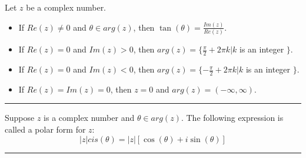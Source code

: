 \begin{theorem}
    Let $z$ be a complex number. 
    
    \begin{itemize}
        \item If $Re(z) \neq 0$ and $\theta \in arg(z)$, then $\tan(\theta) = \frac{Im(z)}{Re(z)}$.
        \item If $Re(z) = 0$ and $Im(z) > 0$, then $arg(z) = \{ \frac{\pi}{2} + 2\pi k | k$ is an integer $\}$.
        \item If $Re(z) = 0$ and $Im(z) < 0$, then $arg(z) = \{ -\frac{\pi}{2} + 2\pi k | k$ is an integer $\}$.
        \item If $Re(z) = Im(z) = 0$, then $z = 0$ and $arg(z) = (- \infty, \infty)$.
    \end{itemize}
\end{theorem}

\medskip \hrule \medskip

\begin{theorem}
    Suppose $z$ is a complex number and $\theta \in arg(z)$. The following expression is called a polar form for $z$:
    \[ |z|cis(\theta) = |z| [\cos(\theta) + i \sin(\theta)] \]
\end{theorem}

\medskip \hrule 